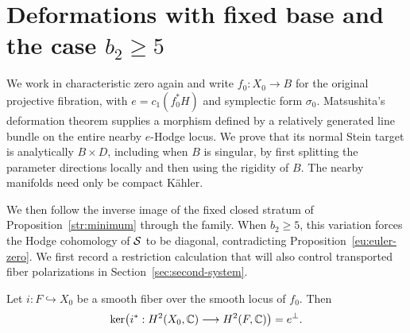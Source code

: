 \section{Deformations with fixed base and the case \texorpdfstring{$b_2\geq5$}{b2 at least 5}}
\label{def:section}
\label{sec:deformation}

We work in characteristic zero again and write
$f_0:X_0\to B$ for the original projective fibration, with
$e=c_1(f_0^*H)$ and symplectic form $\sigma_0$.
Matsushita's deformation theorem supplies a morphism
defined by a relatively generated line bundle on the entire nearby
$e$-Hodge locus.  We prove that its normal Stein target is analytically
$B\times D$, including when $B$ is singular, by first splitting the
parameter directions locally and then using the rigidity of $B$.
The nearby manifolds need only be compact K\"ahler.

We then follow the inverse image of the fixed closed stratum of
Proposition~\ref{str:minimum} through the family.  When $b_2\geq5$,
this variation forces the Hodge cohomology of $\mathcal S$ to be diagonal,
contradicting Proposition~\ref{eu:euler-zero}.
We first record a restriction calculation that will also control
transported fiber polarizations in Section~\ref{sec:second-system}.

\begin{lemma}\label{def:restriction-kernel}
Let $i:F\hookrightarrow X_0$ be a smooth fiber over the smooth locus of
$f_0$.  Then
\begin{equation}\label{def:kernel-equation}
 \ker\bigl(i^*:H^2(X_0,\mathbb C)\longrightarrow H^2(F,\mathbb C)\bigr)=e^\perp.
\end{equation}
\end{lemma}

